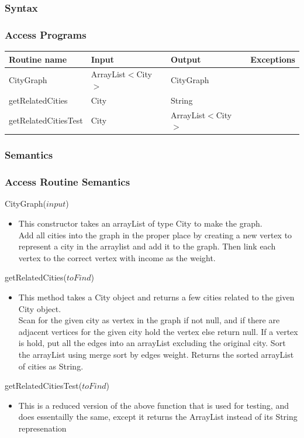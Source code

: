 \documentclass[12pt,fleqn]{article}
\begin{document}
\subsubsection* {Syntax}

\subsubsection* {Access Programs}
\begin{tabular}{| l | l | l | l |}
\hline
\textbf{Routine name} & \textbf{Input} & \textbf{Output} & \textbf{Exceptions}\\
\hline
 CityGraph& ArrayList$<$City$>$ & CityGraph & ~\\
\hline
getRelatedCities & City & String & ~\\
\hline
getRelatedCitiesTest & City & ArrayList$<$City$>$& ~\\
\hline
\end{tabular}

\subsubsection*{Semantics}
\subsubsection*{Access Routine Semantics}
\noindent CityGraph($input$)
\begin{itemize}
\item This constructor takes an arrayList of type City to make the graph.\\
Add all cities into the graph in the proper place by creating a new vertex to represent a city in the
arraylist and add it to the graph. Then link each vertex to the correct vertex with income as the weight.
\end{itemize}
\noindent getRelatedCities($toFind$)
\begin{itemize}
\item This method takes a City object and returns a few cities related to the given City object.\\
Scan for the given city as vertex in the graph if not null, and if there are adjacent vertices for the given
city hold the vertex else return null. If a vertex is hold, put all the edges into an arrayList excluding the
original city. Sort the arrayList using merge sort by edges weight.
Returns the sorted arrayList of cities as String.
\end{itemize}
\noindent getRelatedCitiesTest($toFind$)
\begin{itemize}
\item This is a reduced version of the above function that is used for testing, and does essentailly the same, except it returns the ArrayList instead of its String represenation
\end{itemize}
\end{document}
